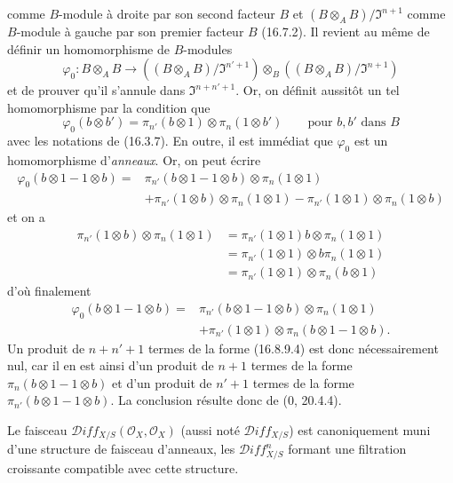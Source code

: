 comme $B$-module à droite par son second facteur $B$ et
$(B\otimes_A B)/\mathfrak{I}^{n+1}$ comme $B$-module à gauche par son premier
facteur $B$ (16.7.2). Il revient au même de définir un homomorphisme de
$B$-modules
\[
  \varphi_0:B\otimes_A B\longrightarrow
  ((B\otimes_A B)/\mathfrak{I}^{n'+1})
  \otimes_B((B\otimes_A B)/\mathfrak{I}^{n+1})
\]
et de prouver qu'il s'annule dans $\mathfrak{I}^{n+n'+1}$. Or, on définit
aussitôt un tel homomorphisme par la condition que
\[
  \varphi_0(b\otimes b')
  =\pi_{n'}(b\otimes1)\otimes\pi_n(1\otimes b')
  \qquad\text{pour $b,b'$ dans $B$}
\]
avec les notations de (16.3.7). En outre, il est immédiat que $\varphi_0$ est
un homomorphisme d'\emph{anneaux}. Or, on peut écrire
\[
  \begin{aligned}
  \varphi_0(b\otimes1-1\otimes b)
  ={}&\pi_{n'}(b\otimes1-1\otimes b)\otimes\pi_n(1\otimes1)\\
  &+\pi_{n'}(1\otimes b)\otimes\pi_n(1\otimes1)
  -\pi_{n'}(1\otimes1)\otimes\pi_n(1\otimes b)
  \end{aligned}
\]
et on a
\[
  \begin{aligned}
  \pi_{n'}(1\otimes b)\otimes\pi_n(1\otimes1)
  &=\pi_{n'}(1\otimes1)b\otimes\pi_n(1\otimes1)\\
  &=\pi_{n'}(1\otimes1)\otimes b\pi_n(1\otimes1)\\
  &=\pi_{n'}(1\otimes1)\otimes\pi_n(b\otimes1)
  \end{aligned}
\]
d'où finalement
\[
  \begin{aligned}
  \varphi_0(b\otimes1-1\otimes b)
  ={}&\pi_{n'}(b\otimes1-1\otimes b)\otimes\pi_n(1\otimes1)\\
  &+\pi_{n'}(1\otimes1)\otimes\pi_n(b\otimes1-1\otimes b).
  \end{aligned}
  \tag{16.8.9.4}
  \label{IV.16.8.9.4}
\]
Un produit de $n+n'+1$ termes de la forme (16.8.9.4) est donc
nécessairement nul, car il en est ainsi d'un produit de $n+1$ termes de la
forme $\pi_n(b\otimes1-1\otimes b)$ et d'un produit de $n'+1$ termes de la
forme $\pi_{n'}(b\otimes1-1\otimes b)$. La conclusion résulte donc de
(0, 20.4.4).

\begin{corollary}[16.8.10]
\label{IV.16.8.10}
Le faisceau $\mathscr{D}\!iff_{X/S}(\mathcal{O}_X,\mathcal{O}_X)$ (aussi noté
$\mathscr{D}\!iff_{X/S}$) est canoniquement muni d'une structure de faisceau
d'anneaux, les $\mathscr{D}\!iff_{X/S}^n$ formant une filtration croissante
compatible avec cette structure.
\end{corollary}

